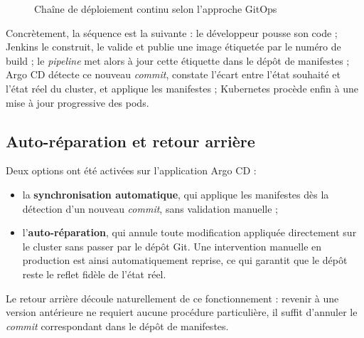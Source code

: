 \begin{figure}[H]
{%
}
\caption{Chaîne de déploiement continu selon l'approche GitOps}
\label{fig:gitops}
\end{figure}

Concrètement, la séquence est la suivante : le développeur pousse son code ; Jenkins le
construit, le valide et publie une image étiquetée par le numéro de build ; le
\textit{pipeline} met alors à jour cette étiquette dans le dépôt de manifestes ; Argo CD
détecte ce nouveau \textit{commit}, constate l'écart entre l'état souhaité et l'état réel
du cluster, et applique les manifestes ; Kubernetes procède enfin à une mise à jour
progressive des pods.

\subsection{Auto-réparation et retour arrière}
Deux options ont été activées sur l'application Argo CD :

\begin{itemize}[label=]
  \item la \textbf{synchronisation automatique}, qui applique les manifestes dès la
        détection d'un nouveau \textit{commit}, sans validation manuelle ;
  \item l'\textbf{auto-réparation}, qui annule toute modification appliquée directement
        sur le cluster sans passer par le dépôt Git. Une intervention manuelle en
        production est ainsi automatiquement reprise, ce qui garantit que le dépôt reste
        le reflet fidèle de l'état réel.
\end{itemize}

Le retour arrière découle naturellement de ce fonctionnement : revenir à une version
antérieure ne requiert aucune procédure particulière, il suffit d'annuler le
\textit{commit} correspondant dans le dépôt de manifestes.

